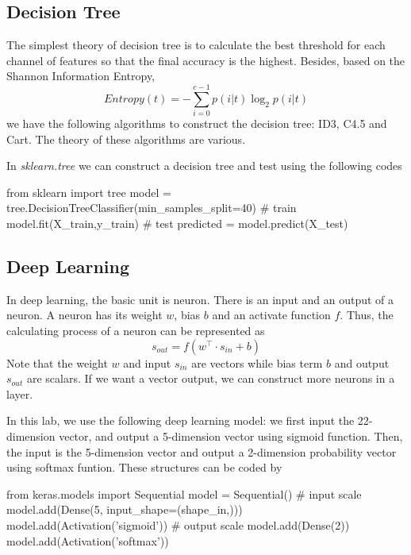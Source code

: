 \documentclass{article}
\begin{document}
\subsection{Decision Tree}
The simplest theory of decision tree is to calculate the best threshold for each channel of features so that the final accuracy is the highest. Besides, based on the Shannon Information Entropy,
\begin{equation}
     Entropy(t)=-\sum_{i=0}^{c-1}p(i|t)\log_2p(i|t)
\end{equation}
we have the following algorithms to construct the decision tree: ID3, C4.5 and Cart. The theory of these algorithms are various.

In \textit{sklearn.tree} we can construct a decision tree and test using the following codes
\begin{python}
     from sklearn import tree
     model =  tree.DecisionTreeClassifier(min_samples_split=40)
     # train
     model.fit(X_train,y_train)
     # test
     predicted =  model.predict(X_test)
\end{python}

\subsection{Deep Learning}
In deep learning, the basic unit is neuron. There is an input and an output of a neuron. A neuron has its weight $w$, bias $b$ and an activate function $f$. Thus, the calculating process of a neuron can be represented as
\begin{equation}
     s_{out}=f(w^\top \cdot s_{in}+b)
\end{equation}
Note that the weight $w$ and input $s_{in}$ are vectors while bias term $b$ and output $s_{out}$ are scalars. If we want a vector output, we can construct more neurons in a layer.

In this lab, we use the following deep learning model: we first input the 22-dimension vector, and output a 5-dimension vector using sigmoid function. Then, the input is the 5-dimension vector and output a 2-dimension probability vector using softmax funtion. These structures can be coded by
\begin{python}
     from keras.models import Sequential
     model =  Sequential()
     # input scale
     model.add(Dense(5, input_shape=(shape_in,))) 
     model.add(Activation('sigmoid'))
     # output scale
     model.add(Dense(2))
     model.add(Activation('softmax'))
\end{python}
\end{document}
